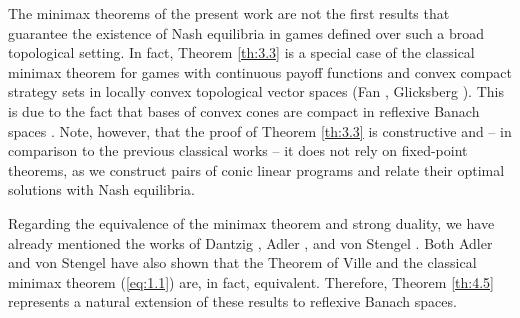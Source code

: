 \documentclass[11pt, twoside]{article}
\numberwithin{equation}{section}
\theoremstyle{definition}
\begin{document}
The minimax theorems of the present work are not the first results that guarantee the existence of Nash equilibria in games defined over such a broad topological setting. In fact, Theorem \ref{th:3.3} is a special case of the classical minimax theorem for games with continuous payoff functions and convex compact strategy sets in locally convex topological vector spaces (Fan \cite{fan1952fixed}, Glicksberg \cite{glicksberg1952further}). This is due to the fact that bases of convex cones are compact in reflexive Banach spaces \cite[Lemma 3.4]{casini2010cones}. Note, however, that the proof of Theorem \ref{th:3.3} is constructive and -- in comparison to the previous classical works -- it does not rely on fixed-point theorems, as we construct pairs of conic linear programs and relate their optimal solutions with Nash equilibria.\par

Regarding the equivalence of the minimax theorem and strong duality, we have already mentioned the works of Dantzig \cite{dantzig1951proof}, Adler \cite{adler2013equivalence}, and von Stengel \cite{von2024zero}. Both Adler \cite[Theorem 11]{adler2013equivalence} and von Stengel \cite[Proposition 4]{von2024zero} have also shown that the Theorem of Ville \cite{ville1938theorie} and the classical minimax theorem (\ref{eq:1.1}) are, in fact, equivalent. Therefore, Theorem \ref{th:4.5} represents a natural extension of these results to reflexive Banach spaces.\par
\end{document}
